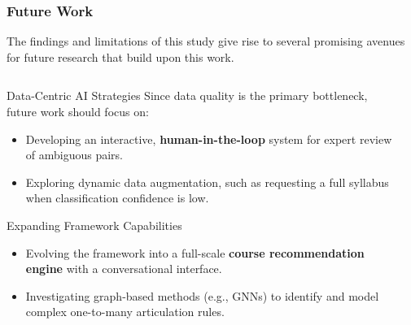 \documentclass[aspectratio=169,10pt]{beamer}
\begin{document}
\begin{frame}
    \frametitle{Future Work}
    
    The findings and limitations of this study give rise to several promising avenues for future research that build upon this work.

    \fontsize{9}{9}\selectfont
    \begin{columns}[T]
        \begin{column}{0.5\textwidth}
            \begin{block}{Data-Centric AI Strategies}
                Since data quality is the primary bottleneck, future work should focus on:
                \begin{itemize}
                    \item Developing an interactive, \textbf{human-in-the-loop} system for expert review of ambiguous pairs.
                    \item Exploring dynamic data augmentation, such as requesting a full syllabus when classification confidence is low.
                \end{itemize}
            \end{block}
            
            \begin{block}{Expanding Framework Capabilities}
                 \begin{itemize}
                    \item Evolving the framework into a full-scale \textbf{course recommendation engine} with a conversational interface.
                    \item Investigating graph-based methods (e.g., GNNs) to identify and model complex one-to-many articulation rules.
                \end{itemize}
            \end{block}
        \end{column}
        
        \begin{column}{0.5\textwidth}
            

\end{column}
\end{columns}
\end{frame}
\end{document}
